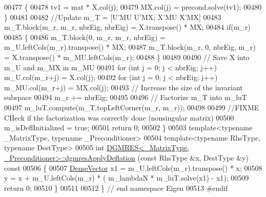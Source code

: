 \begin{DoxyCode}
00477   \{
00478     tv1 = mat * X.col(j);
00479     MX.col(j) = precond.solve(tv1);
00480   \}
00481   
00482   \textcolor{comment}{//Update m\_T = [U'MU U'MX; X'MU X'MX]}
00483   m\_T.block(m\_r, m\_r, nbrEig, nbrEig) = X.transpose() * MX; 
00484   \textcolor{keywordflow}{if}(m\_r)
00485   \{
00486     m\_T.block(0, m\_r, m\_r, nbrEig) = m\_U.leftCols(m\_r).transpose() * MX; 
00487     m\_T.block(m\_r, 0, nbrEig, m\_r) = X.transpose() * m\_MU.leftCols(m\_r);
00488   \}
00489   
00490   \textcolor{comment}{// Save X into m\_U and m\_MX in m\_MU}
00491   \textcolor{keywordflow}{for} (\textcolor{keywordtype}{int} j = 0; j < nbrEig; j++) m\_U.col(m\_r+j) = X.col(j);
00492   \textcolor{keywordflow}{for} (\textcolor{keywordtype}{int} j = 0; j < nbrEig; j++) m\_MU.col(m\_r+j) = MX.col(j);
00493   \textcolor{comment}{// Increase the size of the invariant subspace}
00494   m\_r += nbrEig; 
00495   
00496   \textcolor{comment}{// Factorize m\_T into m\_luT}
00497   m\_luT.compute(m\_T.topLeftCorner(m\_r, m\_r));
00498   
00499   \textcolor{comment}{//FIXME CHeck if the factorization was correctly done (nonsingular matrix)}
00500   m\_isDeflInitialized = \textcolor{keyword}{true};
00501   \textcolor{keywordflow}{return} 0; 
00502 \}
00503 \textcolor{keyword}{template}<\textcolor{keyword}{typename} \_MatrixType, \textcolor{keyword}{typename} \_Preconditioner>
00504 \textcolor{keyword}{template}<\textcolor{keyword}{typename} RhsType, \textcolor{keyword}{typename} DestType>
00505 \textcolor{keywordtype}{int} \hyperlink{class_eigen_1_1_d_g_m_r_e_s}{DGMRES<\_MatrixType, \_Preconditioner>::dgmresApplyDeflation}
      (\textcolor{keyword}{const} RhsType &x, DestType &y)\textcolor{keyword}{ const}
00506 \textcolor{keyword}{}\{
00507   \hyperlink{group___core___module}{DenseVector} x1 = m\_U.leftCols(m\_r).transpose() * x; 
00508   y = x + m\_U.leftCols(m\_r) * ( m\_lambdaN * m\_luT.solve(x1) - x1);
00509   \textcolor{keywordflow}{return} 0; 
00510 \}
00511 
00512 \} \textcolor{comment}{// end namespace Eigen}
00513 \textcolor{preprocessor}{#endif }
\end{DoxyCode}
